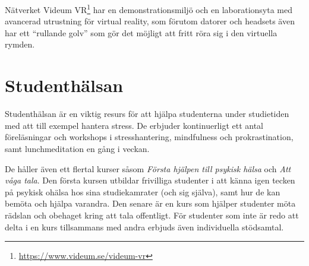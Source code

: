 Nätverket Videum VR\footnote{\url{https://www.videum.se/videum-vr}}  har en demonstrationsmiljö och en laborationsyta med avancerad utrustning för virtual reality, som förutom datorer och headsets även har ett ``rullande golv'' som gör det möjligt att fritt röra sig i den virtuella rymden.

\section{Studenthälsan}

Studenthälsan är en viktig resurs för att hjälpa studenterna under studietiden med att till exempel hantera stress. De erbjuder kontinuerligt ett antal föreläsningar och workshops i stresshantering, mindfulness och prokrastination, samt lunchmeditation en gång i veckan.

De håller även ett flertal kurser såsom \emph{Första hjälpen till psykisk hälsa} och \emph{Att våga tala}. Den första kursen utbildar frivilliga studenter i att känna igen tecken på psykisk ohälsa hos sina studiekamrater (och sig själva), samt hur de kan bemöta och hjälpa varandra. Den senare är en kurs som hjälper studenter möta rädslan och obehaget kring att tala offentligt. För studenter som inte är redo att delta i en kurs tillsammans med andra erbjuds även individuella stödsamtal.